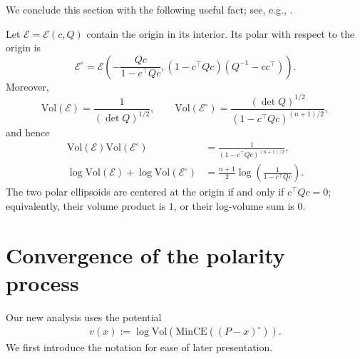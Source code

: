 \documentclass[smallextended]{svjour3}
\newcommand{\V}{{\mathrm{Vol}}}
\newcommand{\E}{\mathcal{E}}
\begin{document}
We conclude this section with the following useful fact; see, e.g.,
\cite{aubrun2017alice,kurzhanski1997ellipsoidal}.
\begin{lemma}\label{lemma: useful_lemma}
Let $\E=\E(c,Q)$ contain the origin in its interior. Its polar with respect to the origin is
\[
    \E^\circ
    =
    \E\!\left(-\frac{Qc}{1-c^\top Q c},
    (1-c^\top Q c)(Q^{-1}-cc^\top)\right).
\]
Moreover,
\[
    \V(\E)=\frac{1}{(\det Q)^{1/2}},
    \qquad
    \V(\E^\circ)=\frac{(\det Q)^{1/2}}{(1-c^\top Q c)^{(n+1)/2}},
\]
and hence
\begin{align*}
    \V(\E)\V(\E^\circ)
    &=\frac{1}{(1-c^\top Q c)^{(n+1)/2}},\\
    \log\V(\E)+\log\V(\E^\circ)
    &=\frac{n+1}{2}\log\!\left(\frac{1}{1-c^\top Q c}\right).
\end{align*}
The two polar ellipsoids are centered at the origin if and only if $c^\top Q c=0$;
equivalently, their volume product is $1$, or their log-volume sum is $0$.
\end{lemma}


\section{Convergence of the polarity process}\label{sec:convergence-polarity-process}
Our new analysis uses the potential
\begin{align}\label{eq: potential function}
    v(x) := \log \V (\mathrm{MinCE}((P-x)^\circ)).
\end{align}
We first introduce the notation for ease of later presentation. 
\end{document}
